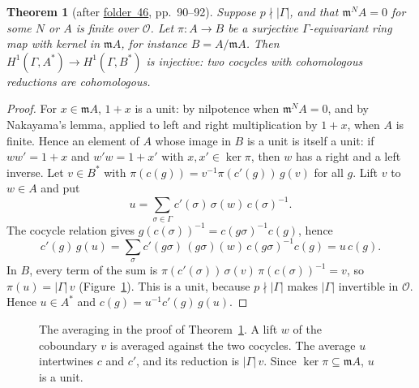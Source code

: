 \documentclass[11pt,a4paper]{amsart}
\newtheorem{theorem}{Theorem}[section]
\theoremstyle{definition}
\theoremstyle{remark}
\newcommand{\cO}{\mathcal O}
\newcommand{\fac}[1]{\href{https://grothendieck.umontpellier.fr/#1.pdf}{folder~#1}}
\begin{document}
\begin{theorem}[after \fac{46}, pp.~90--92]\label{thm:lift}
Suppose $p \nmid |\Gamma|$, and that $\mathfrak m^NA = 0$ for some $N$ or $A$ is finite over $\cO$. Let $\pi\colon A \to B$ be a surjective $\Gamma$-equivariant ring map with kernel in $\mathfrak mA$, for instance $B = A/\mathfrak mA$. Then $H^1(\Gamma, A^*) \to H^1(\Gamma, B^*)$ is injective: two cocycles with cohomologous reductions are cohomologous.
\end{theorem}

\begin{proof}
For $x \in \mathfrak mA$, $1 + x$ is a unit: by nilpotence when $\mathfrak m^NA = 0$, and by Nakayama's lemma, applied to left and right multiplication by $1 + x$, when $A$ is finite. Hence an element of $A$ whose image in $B$ is a unit is itself a unit: if $ww' = 1 + x$ and $w'w = 1 + x'$ with $x, x' \in \ker\pi$, then $w$ has a right and a left inverse. Let $v \in B^*$ with $\pi(c(g)) = v^{-1}\pi(c'(g))\,g(v)$ for all $g$. Lift $v$ to $w \in A$ and put
\[
u = \sum_{\sigma\in\Gamma} c'(\sigma)\,\sigma(w)\,c(\sigma)^{-1}.
\]
The cocycle relation gives $g(c(\sigma))^{-1} = c(g\sigma)^{-1}c(g)$, hence
\[
c'(g)\,g(u) = \sum_\sigma c'(g\sigma)\,(g\sigma)(w)\,c(g\sigma)^{-1}c(g) = u\,c(g).
\]
In $B$, every term of the sum is $\pi(c'(\sigma))\,\sigma(v)\,\pi(c(\sigma))^{-1} = v$, so $\pi(u) = |\Gamma|\,v$ (Figure~\ref{fig:average}). This is a unit, because $p \nmid |\Gamma|$ makes $|\Gamma|$ invertible in $\cO$. Hence $u \in A^*$ and $c(g) = u^{-1}c'(g)\,g(u)$.
\end{proof}

\begin{figure}[ht]
\centering
{}
\caption{The averaging in the proof of Theorem~\ref{thm:lift}. A lift $w$ of the coboundary $v$ is averaged against the two cocycles. The average $u$ intertwines $c$ and $c'$, and its reduction is $|\Gamma|\,v$. Since $\ker\pi \subseteq \mathfrak mA$, $u$ is a unit.}\label{fig:average}
\end{figure}
\end{document}
